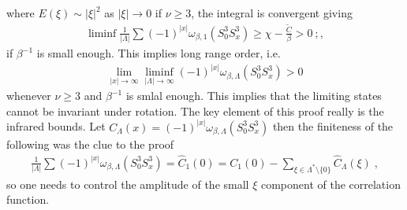 \documentclass[
a4paper, %
11pt, %
onecolumn, %
openany, %
]{memoir}
\theoremstyle{definition}
\theoremstyle{remark}
\theoremstyle{plain}
\begin{document}
where $E(\xi)\sim |\xi|^2$ as $|\xi|\rightarrow 0$ if $\nu\geq 3$, the integral is convergent giving \begin{align}
\liminf \frac{1}{|\Lambda|}\sum(-1)^{|x|}\omega_{\beta,1}(S_0^3S_x^3)\geq \chi - \frac{\tilde{C}}{\beta}> 0\ ;, 
\end{align} 
if $\beta^{-1}$ is small enough. This implies long range order, i.e. \begin{align}\lim_{|x|\rightarrow\infty}\liminf_{|\Lambda|\rightarrow\infty} (-1)^{|x|}\omega_{\beta,\Lambda}(S_0^3S_x^3)>0\end{align}whenever $\nu\geq 3$ and $\beta^{-1}$ is smlal enough. This implies that the limiting states cannot be invariant under rotation. The key element of this proof really is the infrared bounds. Let $C_{\Lambda}(x)=(-1)^{|x|}\omega_{\beta,\Lambda}(S_0^3S_x^3)$ then the finiteness of the following was the clue to the proof \begin{align}
\frac{1}{|\Lambda|}\sum (-1)^{|x|}\omega_{\beta,\Lambda}(S_0^3S_x^3)=\hat{C}_1(0)=C_1(0)-\sum_{\xi\in\Lambda^*\setminus\{0\}}\hat{C}_{\Lambda}(\xi)\; ,
\end{align}
so one needs to control the amplitude of the small $\xi$ component of the correlation function.
\backmatter
\end{document}

